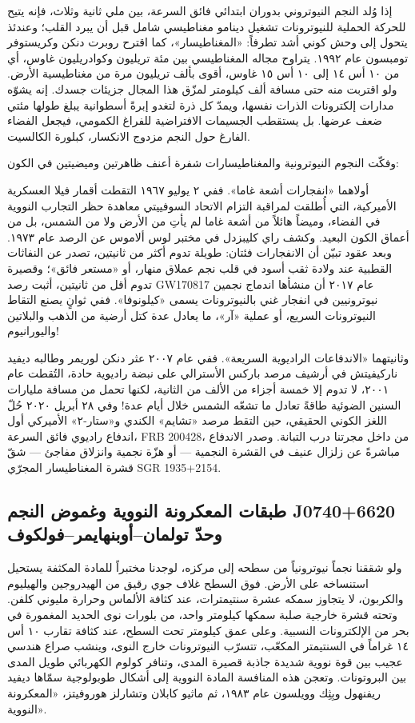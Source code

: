 \documentclass[12pt,a4paper,openany]{book}
\begin{document}
إذا وُلد النجم النيوتروني بدوران ابتدائي فائق السرعة، بين ملي ثانية وثلاث، فإنه يتيح للحركة الحملية للنيوترونات تشغيل دينامو مغناطيسي شامل قبل أن يبرد القلب؛ وعندئذ يتحول إلى وحش كوني أشد تطرفاً: «المغناطيسار»، كما اقترح روبرت دنكن وكريستوفر تومبسون عام ١٩٩٢. يتراوح مجاله المغناطيسي بين مئة تريليون وكوادريليون غاوس، أي من ١٠ أس ١٤ إلى ١٠ أس ١٥ غاوس، أقوى بألف تريليون مرة من مغناطيسية الأرض. ولو اقتربت منه حتى مسافة ألف كيلومتر لمزّق هذا المجال جزيئات جسدك. إنه يشوّه مدارات إلكترونات الذرات نفسها، ويمدّ كل ذرة لتغدو إبرةً أسطوانية يبلغ طولها مئتي ضعف عرضها. بل يستقطب الجسيمات الافتراضية للفراغ الكمومي، فيجعل الفضاء الفارغ حول النجم مزدوج الانكسار، كبلورة الكالسيت.


وفكّت النجوم النيوترونية والمغناطيسارات شفرة أعنف ظاهرتين وميضيتين في الكون:


أولاهما «انفجارات أشعة غاما». ففي ٢ يوليو ١٩٦٧ التقطت أقمار فيلا العسكرية الأميركية، التي أُطلقت لمراقبة التزام الاتحاد السوفييتي معاهدة حظر التجارب النووية في الفضاء، وميضاً هائلاً من أشعة غاما لم يأتِ من الأرض ولا من الشمس، بل من أعماق الكون البعيد. وكشف راي كليبزدل في مختبر لوس ألاموس عن الرصد عام ١٩٧٣. وبعد عقود تبيّن أن الانفجارات فئتان: طويلة تدوم أكثر من ثانيتين، تصدر عن النفاثات القطبية عند ولادة ثقب أسود في قلب نجم عملاق منهار، أو «مستعر فائق»؛ وقصيرة تدوم أقل من ثانيتين، أثبت رصد GW170817 عام ٢٠١٧ أن منشأها اندماج نجمين نيوترونيين في انفجار غني بالنيوترونات يسمى «كيلونوفا». ففي ثوانٍ يصنع التقاط النيوترونات السريع، أو عملية «آر»، ما يعادل عدة كتل أرضية من الذهب والبلاتين واليورانيوم!


وثانيتهما «الاندفاعات الراديوية السريعة». ففي عام ٢٠٠٧ عثر دنكن لوريمر وطالبه ديفيد ناركيفيتش في أرشيف مرصد باركس الأسترالي على نبضة راديوية حادة، التُقطت عام ٢٠٠١، لا تدوم إلا خمسة أجزاء من الألف من الثانية، لكنها تحمل من مسافة مليارات السنين الضوئية طاقةً تعادل ما تشعّه الشمس خلال أيام عدة! وفي ٢٨ أبريل ٢٠٢٠ حُلّ اللغز الكوني الحقيقي، حين التقط مرصد «تشايم» الكندي و«ستار-٢» الأميركي أول اندفاع راديوي فائق السرعة، FRB 200428، من داخل مجرتنا درب التبانة. وصدر الاندفاع مباشرةً عن زلزال عنيف في القشرة النجمية — أو هزّة نجمية وانزلاق مفاجئ — شقّ قشرة المغناطيسار المجرّي SGR 1935+2154.


\subsection*{طبقات المعكرونة النووية وغموض النجم J0740+6620 وحدّ تولمان–أوبنهايمر–فولكوف}

ولو شققنا نجماً نيوترونياً من سطحه إلى مركزه، لوجدنا مختبراً للمادة المكثفة يستحيل استنساخه على الأرض. فوق السطح غلاف جوي رقيق من الهيدروجين والهيليوم والكربون، لا يتجاوز سمكه عشرة سنتيمترات، عند كثافة الألماس وحرارة مليوني كلفن. وتحته قشرة خارجية صلبة سمكها كيلومتر واحد، من بلورات نوى الحديد المغمورة في بحر من الإلكترونات النسبية. وعلى عمق كيلومتر تحت السطح، عند كثافة تقارب ١٠ أس ١٤ غراماً في السنتيمتر المكعّب، تتسرّب النيوترونات خارج النوى، وينشب صراع هندسي عجيب بين قوة نووية شديدة جاذبة قصيرة المدى، وتنافر كولوم الكهربائي طويل المدى بين البروتونات. وتعجن هذه المنافسة المادة النووية إلى أشكال طوبولوجية سمّاها ديفيد ريفنهول وبِثِك وويلسون عام ١٩٨٣، ثم ماثيو كابلان وتشارلز هوروفيتز، «المعكرونة النووية».
\end{document}
